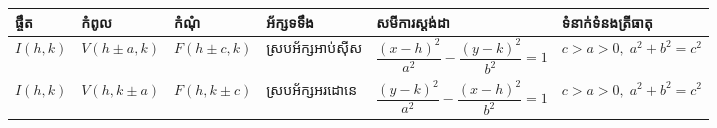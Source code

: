 \begin{landscape}
\begin{table}[H]
\begin{adjustbox}{width=\linewidth}
			\begin{tabular}{|l|l|l|l|l|l|}
				\arrayrulecolor{magenta}%
				\hline
				ផ្ចឹត & កំពូល & កំណុំ & អ័ក្សទទឹង & សមីការស្ដង់ដា & ទំនាក់ទំនងត្រីធាតុ \\
				\hline
				$ I(h,k) $ & $ V(h\pm a,k) $ & $ F(h\pm c,k) $ & ស្របអ័ក្សអាប់ស៊ីស & $ \dfrac{(x-h)^2}{a^2}-\dfrac{(y-k)^2}{b^2}=1 $ & $ c>a>0,\; a^2+b^2=c^2 $\\
				\hline
				$ I(h,k) $ & $ V(h,k\pm a) $ & $ F(h,k\pm c) $ & ស្របអ័ក្សអរដោនេ & $ \dfrac{(y-k)^2}{a^2}-\dfrac{(x-h)^2}{b^2}=1 $ & $ c>a>0,\; a^2+b^2=c^2 $\\
				\hline
			\end{tabular}
		\end{adjustbox}
	\end{table}
\end{landscape}
\clearpage